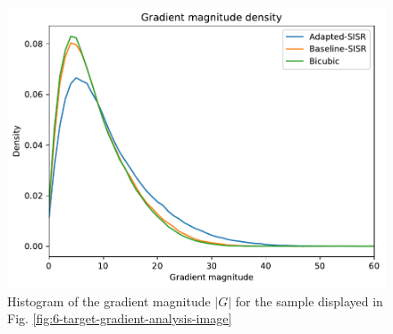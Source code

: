             \begin{figure}[h!]
                \centering
                \includegraphics[scale=0.6]{Includes/6-target-gradient-analysis-histogram.pdf}
                \caption{Histogram of the gradient magnitude $|G|$ for the sample displayed in Fig. \ref{fig:6-target-gradient-analysis-image}}
                \label{fig:6-target-gradient-analysis-histogram}
            \end{figure}
        
        
\breakpage
    